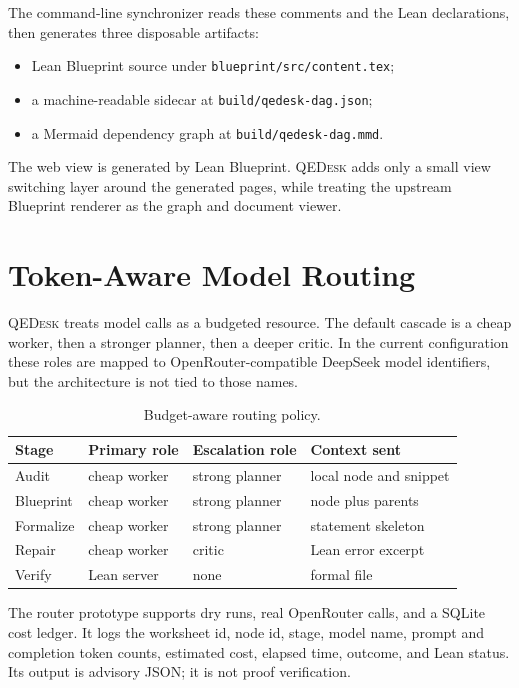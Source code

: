 \documentclass[11pt]{article}
\newcommand{\qedesk}{\textsc{QEDesk}}
\begin{document}
The command-line synchronizer reads these comments and the Lean declarations,
then generates three disposable artifacts:

\begin{itemize}[leftmargin=2em]
  \item Lean Blueprint source under \texttt{blueprint/src/content.tex};
  \item a machine-readable sidecar at \texttt{build/qedesk-dag.json};
  \item a Mermaid dependency graph at \texttt{build/qedesk-dag.mmd}.
\end{itemize}

The web view is generated by Lean Blueprint.  \qedesk{} adds only a small view
switching layer around the generated pages, while treating the upstream
Blueprint renderer as the graph and document viewer.

\section{Token-Aware Model Routing}

\qedesk{} treats model calls as a budgeted resource.  The default cascade is a
cheap worker, then a stronger planner, then a deeper critic.  In the current
configuration these roles are mapped to OpenRouter-compatible DeepSeek model
identifiers, but the architecture is not tied to those names.

\begin{table}[h]
\centering
\small
\begin{tabular}{llll}
\toprule
Stage & Primary role & Escalation role & Context sent \\
\midrule
Audit & cheap worker & strong planner & local node and snippet \\
Blueprint & cheap worker & strong planner & node plus parents \\
Formalize & cheap worker & strong planner & statement skeleton \\
Repair & cheap worker & critic & Lean error excerpt \\
Verify & Lean server & none & formal file \\
\bottomrule
\end{tabular}
\caption{Budget-aware routing policy.}
\label{tab:routing}
\end{table}

The router prototype supports dry runs, real OpenRouter calls, and a SQLite
cost ledger.  It logs the worksheet id, node id, stage, model name, prompt and
completion token counts, estimated cost, elapsed time, outcome, and Lean
status.  Its output is advisory JSON; it is not proof verification.
\end{document}
